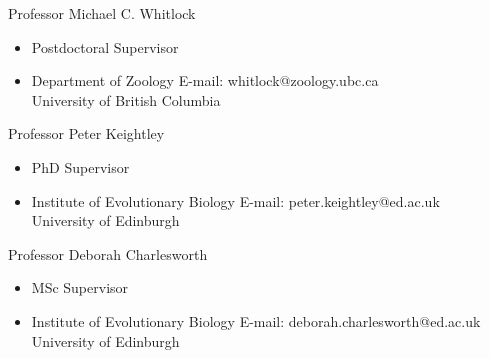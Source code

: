 \documentclass[11pt]{article}
\newenvironment{innerlist}[1][\enskip\textbullet]%
        {\begin{itemize}[#1,leftmargin=*,parsep=0pt,itemsep=0pt,topsep=0pt,partopsep=0pt]}
        {\end{itemize}}
\newcommand{\halfblankline}{\quad\vspace{-0.3\baselineskip}\pagebreak[2]}
\begin{document}
Professor Michael C. Whitlock
\begin{innerlist}
\item[] Postdoctoral Supervisor
\item[] Department of Zoology \hfill{E-mail: whitlock@zoology.ubc.ca}\\
University of British Columbia
\end{innerlist}

\halfblankline

Professor Peter Keightley
\begin{innerlist}
\item[] PhD Supervisor
\item[]  Institute of Evolutionary Biology \hfill{E-mail: peter.keightley@ed.ac.uk}\\
University of Edinburgh
\end{innerlist}

\halfblankline

Professor Deborah Charlesworth
\begin{innerlist}
\item[] MSc Supervisor
\item[]  Institute of Evolutionary Biology \hfill{E-mail: deborah.charlesworth@ed.ac.uk}\\
University of Edinburgh
\end{innerlist}
\end{document}
